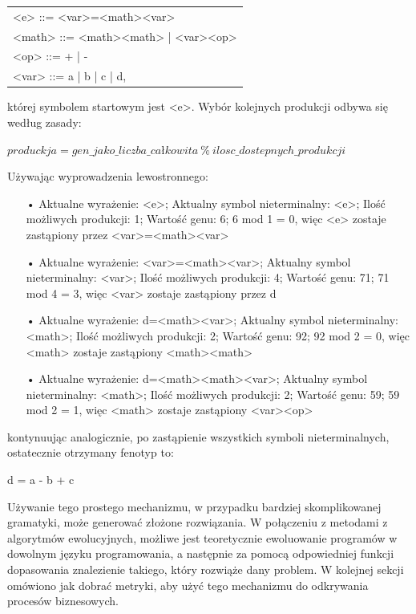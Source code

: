  \begin{center}
  \begin{tabular}{l}
    <e> ::= <var>=<math><var> \\
	<math> ::= <math><math> | <var><op> \\
	<op> ::= + | - \\
	<var> ::= a | b | c | d, \\
  \end{tabular}
 \end{center}

której symbolem startowym jest <e>. 
Wybór kolejnych produkcji odbywa się według zasady:
\begin{center} $produckja = gen\_jako\_liczba\_całkowita\ \%\ ilosc\_dostepnych\_produkcji$ \end{center}
Używając wyprowadzenia lewostronnego:

\begin{itemize}
  \item[•] Aktualne wyrażenie: <e>;
Aktualny symbol nieterminalny: <e>;
Ilość możliwych produkcji: 1;
Wartość genu: 6;
6 mod 1 = 0, więc <e> zostaje zastąpiony przez <var>=<math><var>
  \item[•] Aktualne wyrażenie: <var>=<math><var>;
Aktualny symbol nieterminalny: <var>;
Ilość możliwych produkcji: 4;
Wartość genu: 71;
71 mod 4 = 3, więc <var> zostaje zastąpiony przez d
  \item[•] Aktualne wyrażenie: d=<math><var>;
Aktualny symbol nieterminalny: <math>;
Ilość możliwych produkcji: 2;
Wartość genu: 92;
92 mod 2 = 0, więc <math> zostaje zastąpiony <math><math>
  \item[•] Aktualne wyrażenie: d=<math><math><var>;
Aktualny symbol nieterminalny: <math>;
Ilość możliwych produkcji: 2;
Wartość genu: 59;
59 mod 2 = 1, więc <math> zostaje zastąpiony <var><op>
\end{itemize}
kontynuując analogicznie, po zastąpienie wszystkich symboli nieterminalnych, ostatecznie otrzymany fenotyp to:
\begin{center} d = a - b + c \end{center}	
Używanie tego prostego mechanizmu, w przypadku bardziej skomplikowanej gramatyki, może generować złożone rozwiązania. W połączeniu z metodami z algorytmów ewolucyjnych, możliwe jest teoretycznie ewoluowanie programów w dowolnym języku programowania, a następnie za pomocą odpowiedniej funkcji dopasowania znalezienie takiego, który rozwiąże dany problem. W kolejnej sekcji omówiono jak dobrać metryki, aby użyć tego mechanizmu do odkrywania procesów biznesowych.


